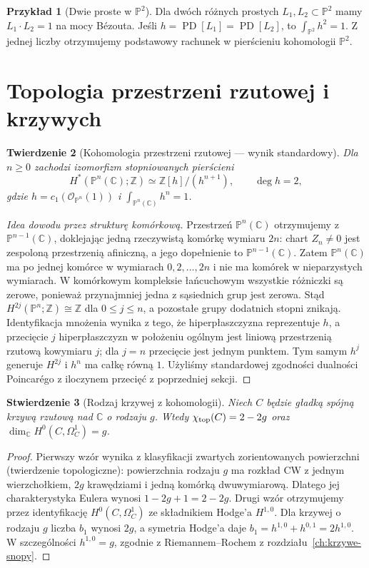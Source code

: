 \documentclass[11pt,a4paper,openany]{report}
\numberwithin{equation}{section}
\theoremstyle{plain}
\newtheorem{twierdzenie}{Twierdzenie}[section]
\newtheorem{stwierdzenie}[twierdzenie]{Stwierdzenie}
\theoremstyle{definition}
\newtheorem{przyklad}[twierdzenie]{Przykład}
\theoremstyle{remark}
\newcommand{\Z}{\mathbb Z}
\newcommand{\C}{\mathbb C}
\newcommand{\PP}{\mathbb P}
\begin{document}
\begin{przyklad}[Dwie proste w $\PP^2$]
Dla dwóch różnych prostych $L_1,L_2\subset\PP^2$ mamy
$L_1\cdot L_2=1$ na mocy Bézouta. Jeśli
$h=\operatorname{PD}[L_1]=\operatorname{PD}[L_2]$,
to $\int_{\PP^2}h^2=1$. Z jednej liczby otrzymujemy
podstawowy rachunek w pierścieniu kohomologii $\PP^2$.
\end{przyklad}

\section{Topologia przestrzeni rzutowej i krzywych}
\label{sec:ga10-projektywne}

\begin{twierdzenie}[Kohomologia przestrzeni rzutowej — wynik standardowy]
\label{tw:ga10-cp-cohom}
Dla $n\ge0$ zachodzi izomorfizm stopniowanych pierścieni
\[
 H^*(\PP^n(\C);\Z)\simeq\Z[h]/(h^{n+1}),
 \qquad \deg h=2,
\]
gdzie $h=c_1(\mathcal O_{\PP^n}(1))$ i
$\int_{\PP^n(\C)}h^n=1$.
\end{twierdzenie}
\begin{proof}[Idea dowodu przez strukturę komórkową]
Przestrzeń $\PP^n(\C)$ otrzymujemy z
$\PP^{n-1}(\C)$, doklejając jedną rzeczywistą komórkę
wymiaru $2n$: chart $Z_n\ne0$ jest zespoloną przestrzenią
afiniczną, a jego dopełnienie to $\PP^{n-1}(\C)$.
Zatem $\PP^n(\C)$ ma po jednej komórce
w wymiarach $0,2,\ldots,2n$ i nie ma komórek
w nieparzystych wymiarach. W komórkowym kompleksie
łańcuchowym wszystkie różniczki są zerowe,
ponieważ przynajmniej jedna z sąsiednich grup jest zerowa.
Stąd $H^{2j}(\PP^n;\Z)\cong\Z$ dla $0\le j\le n$,
a pozostałe grupy dodatnich stopni znikają.
Identyfikacja mnożenia wynika z tego, że hiperpłaszczyzna
reprezentuje $h$, a przecięcie $j$ hiperpłaszczyzn w
położeniu ogólnym jest liniową przestrzenią rzutową
kowymiaru $j$; dla $j=n$ przecięcie jest jednym punktem.
Tym samym $h^j$ generuje $H^{2j}$ i $h^n$ ma całkę równą $1$.
Użyliśmy standardowej zgodności dualności Poincarégo
z iloczynem przecięć z poprzedniej sekcji.
\end{proof}

\begin{stwierdzenie}[Rodzaj krzywej z kohomologii]
Niech $C$ będzie gładką spójną krzywą rzutową nad $\C$
o rodzaju $g$. Wtedy $\chi_{\rm top}(C)=2-2g$ oraz
$\dim_{\C}H^0(C,\Omega^1_C)=g$.
\end{stwierdzenie}
\begin{proof}
Pierwszy wzór wynika z klasyfikacji zwartych zorientowanych
powierzchni (twierdzenie topologiczne): powierzchnia rodzaju $g$
ma rozkład CW z jednym wierzchołkiem, $2g$ krawędziami
i jedną komórką dwuwymiarową. Dlatego jej charakterystyka
Eulera wynosi $1-2g+1=2-2g$.
Drugi wzór otrzymujemy przez identyfikację
$H^0(C,\Omega^1_C)$ ze składnikiem Hodge'a $H^{1,0}$.
Dla krzywej o rodzaju $g$ liczba $b_1$ wynosi $2g$,
a symetria Hodge'a daje $b_1=h^{1,0}+h^{0,1}=2h^{1,0}$.
W szczególności $h^{1,0}=g$, zgodnie z Riemannem--Rochem
z rozdziału~\ref{ch:krzywe-snopy}.
\end{proof}
\end{document}
